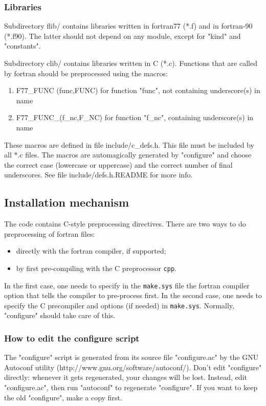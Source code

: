\documentclass[12pt,a4paper]{article}
\begin{document}
\subsubsection{ Libraries}

Subdirectory flib/ contains libraries written in fortran77 (*.f) and in 
fortran-90 (*.f90).
The latter should not depend on any module, except for "kind" and "constants".

Subdirectory clib/ contains libraries written in C (*.c). 
Functions that are called by fortran
should be preprocessed using the macros:
\begin{enumerate}
\item F77\_FUNC (func,FUNC) for function "func", not containing underscore(s) in name 
\item F77\_FUNC\_(f\_nc,F\_NC) for function "f\_nc", containing underscore(s) in name
\end{enumerate}
These macros are defined in file include/c\_defs.h. This file must be included
by all *.c files. The macros are automagically generated by "configure" and 
choose the correct case 
(lowercase or uppercase) and the correct number of final underscores. 
See file include/defs.h.README for more info.

\subsection{Installation mechanism}

The code contains C-style preprocessing directives. There are two ways to do preprocessing of fortran files:
\begin{itemize}
\item directly with the fortran compiler, if supported;
\item by first pre-compiling with the C preprocessor \texttt{cpp}.
\end{itemize}

In the first case, one needs to specify in the \texttt{make.sys} file the fortran compiler option that tells the compiler to pre-process first. In the second case, one needs to
specify the C precompiler and options (if needed) in \texttt{make.sys}.
Normally, "configure" should take care of this.


\subsubsection{ How to edit the configure script}

The "configure" script is generated from its source file
"configure.ac" by the GNU Autoconf utility
(http://www.gnu.org/software/autoconf/).  Don't edit "configure"
directly: whenever it gets regenerated, your changes will be lost.
Instead, edit "configure.ac", then run "autoconf" to regenerate
"configure". If you want to keep the old "configure", make a copy
first.
\end{document}
